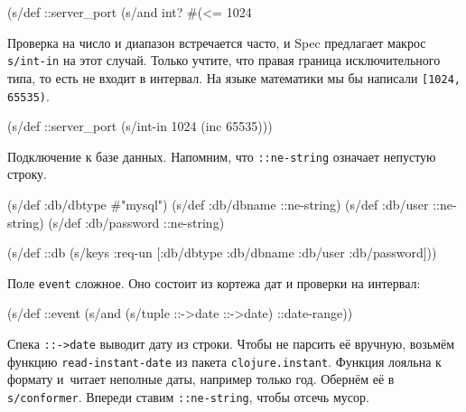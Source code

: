 \begin{english}
  \begin{clojure}
(s/def ::server_port
  (s/and int? #(<= 1024 %
  \end{clojure}
\end{english}


Проверка на число и диапазон встречается часто, и Spec предлагает макрос
\verb|s/int-in| на этот случай. Только учтите, что правая граница
исключительного типа, то есть не входит в интервал. На языке математики мы бы
написали \verb|[1024, 65535)|.

\begin{english}
  \begin{clojure}
(s/def ::server_port
  (s/int-in 1024 (inc 65535)))
  \end{clojure}
\end{english}


\noindent
Подключение к базе данных. Напомним, что \verb|::ne-string| означает
непустую строку.

\begin{english}
  \begin{clojure}
(s/def :db/dbtype   #{"mysql"})
(s/def :db/dbname   ::ne-string)
(s/def :db/user     ::ne-string)
(s/def :db/password ::ne-string)

(s/def ::db
  (s/keys :req-un [:db/dbtype
                   :db/dbname
                   :db/user
                   :db/password]))
  \end{clojure}
\end{english}

Поле \verb|event| сложное. Оно состоит из кортежа дат и проверки на интервал:

\begin{english}
  \begin{clojure}
(s/def ::event
  (s/and (s/tuple ::->date ::->date)
         ::date-range))
  \end{clojure}
\end{english}


Спека \verb|::->date| выводит дату из строки. Чтобы не парсить её вручную,
возьмём функцию \verb|read-instant-date| из пакета \verb|clojure.instant|.
Функция лояльна к формату и~читает неполные даты, например только год.
Обернём её в \verb|s/conformer|. Впереди ставим \verb|::ne-string|,
чтобы отсечь мусор.

